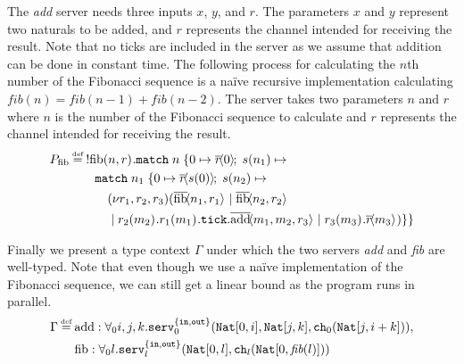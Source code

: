 The \textit{add} server needs three inputs $x$, $y$, and $r$. The parameters $x$ and $y$ represent two naturals to be added, and $r$ represents the channel intended for receiving the result. Note that no ticks are included in the server as we assume that addition can be done in constant time. The following process for calculating the $n$th number of the Fibonacci sequence is a naïve recursive implementation calculating $\textit{fib}(n)=\textit{fib}(n-1)+\textit{fib}(n-2)$. The server takes two parameters $n$ and $r$ where $n$ is the number of the Fibonacci sequence to calculate and $r$ represents the channel intended for receiving the result.
%
\newcommand{\funcf}[0]{l}
\newcommand{\funcg}[0]{l}
\newcommand{\funcgp}[0]{l-1}
\newcommand{\funcgpp}[0]{l-2}
\newcommand{\funcgppp}[0]{l-1}
\begin{align*}
    P_\text{fib}\defeq&\; \bang\inputch{\text{fib}}{n,r}{}{
         \texttt{match}\; n\; \{ 0 \mapsto \asyncoutputch{r}{0}{}\!;\;
              \succc{n_1} \mapsto\\ 
              &\quad\texttt{match}\; n_1\; \{
                    0 \mapsto \asyncoutputch{r}{\succc{0}}{}\!;\;
                    \succc{n_2} \mapsto\\ &\quad\quad\newvar{r_1,r_2,r_3}{(\asyncoutputch{\text{fib}}{n_1,r_1}{}\mid\asyncoutputch{\text{fib}}{n_2,r_2}{}\\
    &\quad\quad\mid\inputch{r_2}{m_2}{}{\inputch{r_1}{m_1}{}{\tick{\asyncoutputch{\text{add}}{m_1,m_2,r_3}{}}}\mid \inputch{r_3}{m_3}{}{\asyncoutputch{r}{m_3}{}}})}\}\}
    }
\end{align*}

Finally we present a type context $\Gamma$ under which the two servers \textit{add} and \textit{fib} are well-typed. Note that even though we use a naïve implementation of the Fibonacci sequence, we can still get a linear bound as the program runs in parallel.
%
\begin{align*}
    \Gamma \defeq&\; \text{add} : \servt{0}{i,j,k}{\{\texttt{in},\texttt{out}\}}{0}{\texttt{Nat}[0,i],\texttt{Nat}[j,k],\channeltypeS{0}{\texttt{Nat}[j,i+k]}},\\
    &\;\text{fib} : \servt{0}{l}{\{\texttt{in},\texttt{out}\}}{\funcf}{\texttt{Nat}[0,l],\channeltypeS{\funcg}{\texttt{Nat}[0,\textit{fib}(l)]}}
\end{align*}

